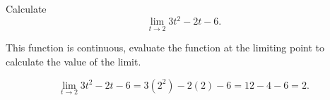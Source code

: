 \documentclass{ximera}
\author{Emma Smith Zbarsky}
\begin{document}
\begin{exercise}

Calculate \[\lim_{t\to 2} 3t^2-2t-6.\]


\begin{hint}
This function is continuous, evaluate the function at the limiting point
to calculate the value of the limit.
\end{hint}


\begin{hint}
\[\lim_{t \to 2} 3t^2-2t-6 = 3(2^2)-2(2)-6 = 12-4-6 = 2.\]
\end{hint}


\begin{multipleChoice}
\choice{$\infty$}
\end{multipleChoice}

\end{exercise}
\end{document}
